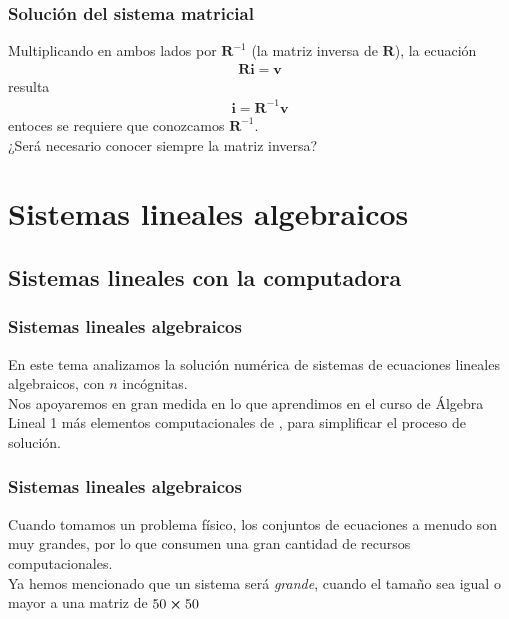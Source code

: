 \begin{frame}
\frametitle{Solución del sistema matricial}
Multiplicando en ambos lados por $\mathbf{R}^{-1}$ (la matriz inversa de $\mathbf{R}$), la ecuación
\begin{align*}
\mathbf{Ri} = \mathbf{v}
\end{align*}
resulta
\begin{align*}
\mathbf{i} = \mathbf{R}^{-1}\mathbf{v}
\end{align*}
entoces se requiere que conozcamos $\mathbf{R}^{-1}$.
\\
\bigskip
\pause
¿Será necesario conocer siempre la matriz inversa?
\end{frame}
\section{Sistemas lineales algebraicos}
\subsection*{Sistemas lineales con la computadora}
\begin{frame}
\frametitle{Sistemas lineales algebraicos}
En este tema analizamos la solución numérica de sistemas de ecuaciones lineales algebraicos, con $n$ incógnitas.
\\
\bigskip
Nos apoyaremos en gran medida en lo que aprendimos en el curso de Álgebra Lineal 1 más elementos computacionales de \python, para simplificar el proceso de solución.
\end{frame}
\begin{frame}
\frametitle{Sistemas lineales algebraicos}
Cuando tomamos un problema físico, los conjuntos de ecuaciones a menudo son muy grandes, por lo que consumen una gran cantidad de recursos computacionales.
\\
\bigskip
Ya hemos mencionado que un sistema será \emph{grande}, cuando el tamaño sea igual o mayor a una matriz de $50 \cp 50$ 
\end{frame}

